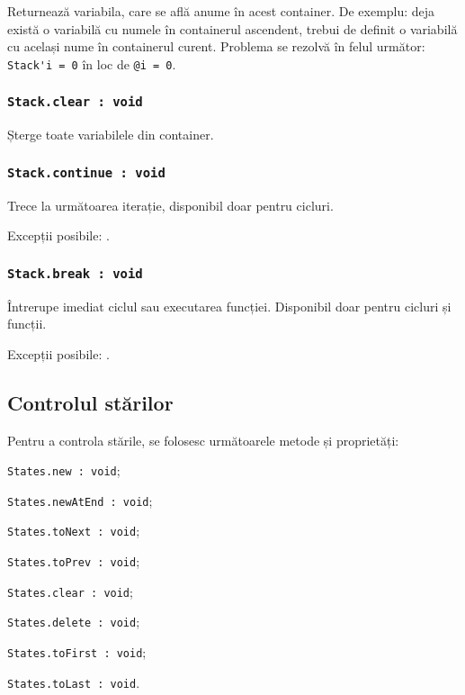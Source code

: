 Returnează variabila, care se află anume în acest container. De exemplu: deja există o variabilă cu numele  în containerul ascendent, trebui de definit o variabilă cu același nume în containerul curent. Problema se rezolvă în felul următor: \lstinline|Stack'i = 0| în loc de \lstinline|@i = 0|.

\subsubsection{\lstinline|Stack.clear : void|}

Șterge toate variabilele din container.

\subsubsection{\lstinline|Stack.continue : void|}

Trece la următoarea iterație, disponibil doar pentru cicluri.

Excepții posibile: .

\subsubsection{\lstinline|Stack.break : void|}

Întrerupe imediat ciclul sau executarea funcției. Disponibil doar pentru cicluri și funcții.

Excepții posibile: .

\subsection{Controlul stărilor}

Pentru a controla stările, se folosesc următoarele metode și proprietăți:
\begin{icItems}
	\item \lstinline|States.new : void|;
	\item \lstinline|States.newAtEnd : void|;
	\item \lstinline|States.toNext : void|;
	\item \lstinline|States.toPrev : void|;
	\item \lstinline|States.clear : void|;
	\item \lstinline|States.delete : void|;
	\item \lstinline|States.toFirst : void|;
	\item \lstinline|States.toLast : void|.
\end{icItems}

